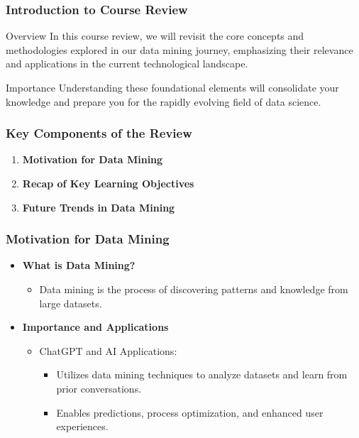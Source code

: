 \documentclass[aspectratio=169]{beamer}
\begin{document}
\frame{\titlepage}

\begin{frame}[fragile]
    \frametitle{Introduction to Course Review}
    \begin{block}{Overview}
        In this course review, we will revisit the core concepts and methodologies explored in our data mining journey, emphasizing their relevance and applications in the current technological landscape.
    \end{block}
    \begin{block}{Importance}
        Understanding these foundational elements will consolidate your knowledge and prepare you for the rapidly evolving field of data science.
    \end{block}
\end{frame}

\begin{frame}[fragile]
    \frametitle{Key Components of the Review}
    \begin{enumerate}
        \item \textbf{Motivation for Data Mining}
        \item \textbf{Recap of Key Learning Objectives}
        \item \textbf{Future Trends in Data Mining}
    \end{enumerate}
\end{frame}

\begin{frame}[fragile]
    \frametitle{Motivation for Data Mining}
    \begin{itemize}
        \item \textbf{What is Data Mining?}
            \begin{itemize}
                \item Data mining is the process of discovering patterns and knowledge from large datasets.
            \end{itemize}
        \item \textbf{Importance and Applications}
            \begin{itemize}
                \item ChatGPT and AI Applications:
                \begin{itemize}
                    \item Utilizes data mining techniques to analyze datasets and learn from prior conversations.
                    \item Enables predictions, process optimization, and enhanced user experiences.
                \end{itemize}
            \end{itemize}
    \end{itemize}
\end{frame}
\end{document}
